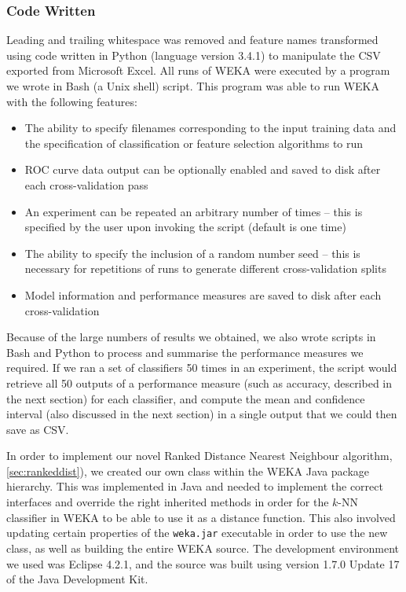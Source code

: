 \subsubsection{Code Written}
\label{sec:code}
Leading and trailing whitespace was removed and feature names transformed using
code written in Python (language version 3.4.1) to manipulate the CSV exported
from Microsoft Excel. All runs of WEKA were executed by
a program we wrote in Bash (a Unix shell) script. This program was able to run
WEKA with the following features:
\begin{itemize}
\item The ability to specify filenames corresponding to the input training data
and the specification of classification or feature selection algorithms to run
\item ROC curve data output can be optionally enabled and saved to disk after
each cross-validation pass
\item An experiment can be repeated an arbitrary number of times -- this is
specified by the user upon invoking the script (default is one time)
\item The ability to specify the inclusion of a random number seed -- this is
necessary for repetitions of runs to generate different cross-validation splits
\item Model information and performance measures are saved to disk after each
cross-validation
\end{itemize}

Because of the large numbers of results we obtained, we also wrote scripts in
Bash and Python to process and summarise the performance measures we required.
If we ran a set of classifiers 50 times in an experiment, the script would
retrieve all 50 outputs of a performance measure (such as accuracy, described
in the next section) for each classifier, and compute the mean and confidence
interval (also discussed in the next section) in a single output that we could
then save as CSV.

In order to implement our novel Ranked Distance Nearest Neighbour algorithm,
\ref{sec:rankeddist}), we created our own class within the WEKA Java package
hierarchy. This was implemented in Java and needed to implement the correct
interfaces and override the right inherited methods in order for the $k$-NN
classifier in WEKA to be able to use it as a distance function. This also
involved updating certain properties of the \texttt{weka.jar} executable in
order to use the new class, as well as building the entire WEKA source. The
development environment we used was Eclipse 4.2.1, and the
source was built using version 1.7.0 Update 17 of the Java Development Kit.

